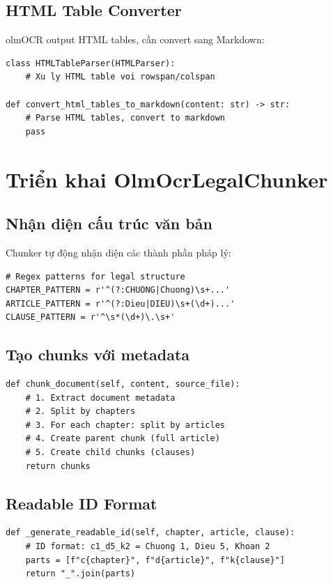\documentclass[../DoAn.tex]{subfiles}
\begin{document}
\subsection{HTML Table Converter}
olmOCR output HTML tables, cần convert sang Markdown:

\begin{verbatim}
class HTMLTableParser(HTMLParser):
    # Xu ly HTML table voi rowspan/colspan
    
def convert_html_tables_to_markdown(content: str) -> str:
    # Parse HTML tables, convert to markdown
    pass
\end{verbatim}

\section{Triển khai OlmOcrLegalChunker}

\subsection{Nhận diện cấu trúc văn bản}
Chunker tự động nhận diện các thành phần pháp lý:

\begin{verbatim}
# Regex patterns for legal structure
CHAPTER_PATTERN = r'^(?:CHUONG|Chuong)\s+...'
ARTICLE_PATTERN = r'^(?:Dieu|DIEU)\s+(\d+)...'
CLAUSE_PATTERN = r'^\s*(\d+)\.\s+'
\end{verbatim}

\subsection{Tạo chunks với metadata}
\begin{verbatim}
def chunk_document(self, content, source_file):
    # 1. Extract document metadata
    # 2. Split by chapters
    # 3. For each chapter: split by articles
    # 4. Create parent chunk (full article)
    # 5. Create child chunks (clauses)
    return chunks
\end{verbatim}

\subsection{Readable ID Format}
\begin{verbatim}
def _generate_readable_id(self, chapter, article, clause):
    # ID format: c1_d5_k2 = Chuong 1, Dieu 5, Khoan 2
    parts = [f"c{chapter}", f"d{article}", f"k{clause}"]
    return "_".join(parts)
\end{verbatim}
\end{document}
